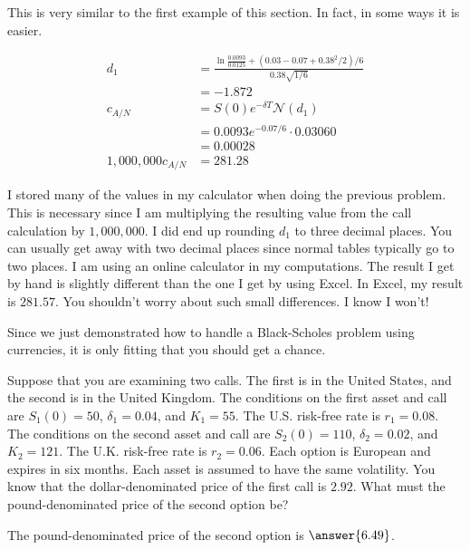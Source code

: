 \documentclass{ximera}
\begin{document}
\begin{solution}
This is very similar to the first example of this section. In fact, in some ways it is easier.

	\begin{align*}
	d_1 			&=\frac{\ln\frac{0.0093}{0.0125}+(0.03-0.07+0.38^2/2)/6}{0.38\sqrt{1/6}}\\
				&=-1.872\\
	c_{A/N} 		&=S(0)e^{-\delta T}\mathcal{N}(d_1)\\
				&=0.0093e^{-0.07/6}\cdot 0.03060\\
				&=0.00028\\
	1,000,000c_{A/N} 	&=281.28
	\end{align*}

\end{solution}

I stored many of the values in my calculator when doing the previous problem. This is necessary since I am multiplying the resulting value from the call calculation by $1,000,000$. I did end up rounding $d_1$ to three decimal places. You can usually get away with two decimal places since normal tables typically go to two places. I am using an online calculator in my computations. The result I get by hand is slightly different than the one I get by using Excel. In Excel, my result is $281.57$. You shouldn't worry about such small differences. I know I won't!

Since we just demonstrated how to handle a Black-Scholes problem using currencies, it is only fitting that you should get a chance.

\begin{question}
Suppose that you are examining two calls. The first is in the United States, and the second is in the United Kingdom. The conditions on the first asset and call are $S_1(0)=50$, $\delta_1=0.04$, and $K_1=55$. The U.S. risk-free rate is $r_1=0.08$. The conditions on the second asset and call are $S_2(0)=110$, $\delta_2=0.02$, and $K_2=121$. The U.K. risk-free rate is $r_2=0.06$. Each option is European and expires in six months. Each asset is assumed to have the same volatility. You know that the dollar-denominated price of the first call is $2.92$. What must the pound-denominated price of the second option be?

The pound-denominated price of the second option is $\answer{6.49}$.
\end{question}
\end{document}

